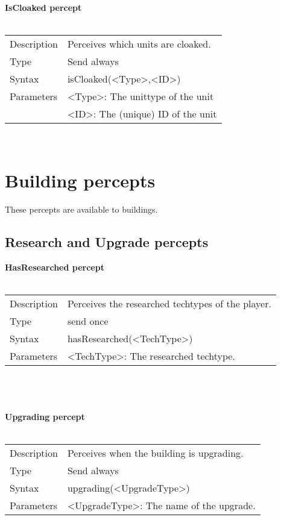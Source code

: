 \documentclass[english,11pt]{report}
\begin{document}
\noindent
\textbf{IsCloaked percept}\\
\\
\begin{tabularx}{\textwidth}{lX}
 Description & Perceives which units are cloaked. \\
 Type & Send always \\
 Syntax & isCloaked(<Type>,<ID>) \\
 Parameters &   <Type>: The unittype of the unit \\
            &   <ID>: The (unique) ID of the unit
\end{tabularx} \\

\newpage
\section{Building percepts}
These percepts are available to buildings.

\subsection{Research and Upgrade percepts}
\textbf{HasResearched percept}\\
\\
\begin{tabularx}{\textwidth}{lX}
 Description & Perceives the researched techtypes of the player. \\
 Type & send once \\
 Syntax & hasResearched(<TechType>) \\
 Parameters &   <TechType>: The researched techtype.
\end{tabularx}\\
\\
\\
\textbf{Upgrading percept}\\
\\
\begin{tabularx}{\textwidth}{lX}
 Description & Perceives when the building is upgrading. \\
 Type & Send always \\
 Syntax & upgrading(<UpgradeType>) \\
 Parameters &   <UpgradeType>: The name of the upgrade.
\end{tabularx}\\
\\
\\
\end{document}
